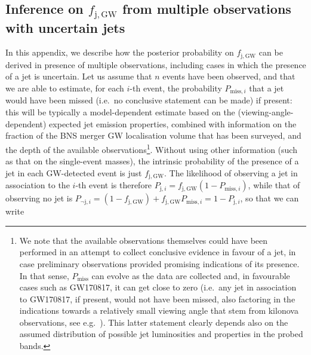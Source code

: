 \documentclass[]{aa}
\begin{document}

\footnotesize

\normalsize



\begin{appendix}
\section{Inference on $f_\mathrm{j,GW}$ from multiple observations with uncertain jets}\label{sec:fjGW_multiple}

In this appendix, we describe how the posterior probability on $f_\mathrm{j,GW}$ can be derived in presence of multiple observations, including cases in which the presence of a jet is uncertain. Let us assume that $n$ events have been observed, and that we are able to estimate, for each $i$-th event, the probability $P_{\mathrm{miss},i}$ that a jet would have been missed (i.e.~no conclusive statement can be made) if present: this will be typically a model-dependent estimate based on the (viewing-angle-dependent) expected jet emission properties, combined with information on the fraction of the BNS merger GW localisation volume that has been surveyed, and the depth of the available observations\footnote{We note that the available observations themselves could have been performed in an attempt to collect conclusive evidence in favour of a jet, in case preliminary observations provided promising indications of its presence. In that sense, $P_\mathrm{miss}$ can evolve as the data are collected and, in favourable cases such as GW170817, it can get close to zero (i.e.~any jet in association to GW170817, if present, would not have been missed, also factoring in the indications towards a relatively small viewing angle that stem from kilonova observations, see e.g.~\citealt{Breschi2021}). This latter statement clearly depends also on the assumed distribution of possible jet luminosities and properties in the probed bands. }. Without using other information (such as that on the single-event masses), the intrinsic probability of the presence of a jet in each GW-detected event is just $f_\mathrm{j,GW}$. The likelihood of observing a jet in association to the $i$-th event is therefore $P_{\mathrm{j},i}=f_\mathrm{j,GW}(1-P_{\mathrm{miss},i})$, while that of observing no jet is $P_{\neg\mathrm{j},i}=(1-f_\mathrm{j,GW}) + f_\mathrm{j,GW}P_{\mathrm{miss},i}=1-P_{\mathrm{j},i}$, so that we can write 

\end{appendix}
\end{document}
